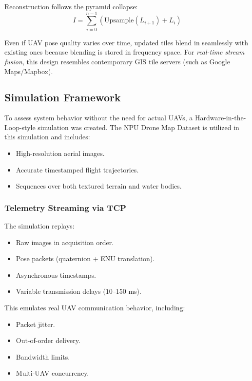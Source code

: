 \documentclass[conference]{IEEEtran}
\begin{document}
Reconstruction follows the pyramid collapse:
\begin{equation}
I = \sum_{i=0}^{n-1} \left( \text{Upsample}(L_{i+1}) + L_i \right)
\end{equation}

Even if UAV pose quality varies over time, updated tiles blend in seamlessly with existing ones because blending is stored in frequency space. For \emph{real-time stream fusion}, this design resembles contemporary GIS tile servers (such as Google Maps/Mapbox).

\subsection{Simulation Framework}
To assess system behavior without the need for actual UAVs, a Hardware-in-the-Loop-style simulation was created. The NPU Drone Map Dataset is utilized in this simulation and includes:
\begin{itemize}
    \item High-resolution aerial images.
    \item Accurate timestamped flight trajectories.
    \item Sequences over both textured terrain and water bodies.
\end{itemize}

\subsubsection{Telemetry Streaming via TCP}
The simulation replays:
\begin{itemize}
    \item Raw images in acquisition order.
    \item Pose packets (quaternion + ENU translation).
    \item Asynchronous timestamps.
    \item Variable transmission delays ($10$--$150$ ms).
\end{itemize}
This emulates real UAV communication behavior, including:
\begin{itemize}
    \item Packet jitter.
    \item Out-of-order delivery.
    \item Bandwidth limits.
    \item Multi-UAV concurrency.
\end{itemize}
\end{document}
